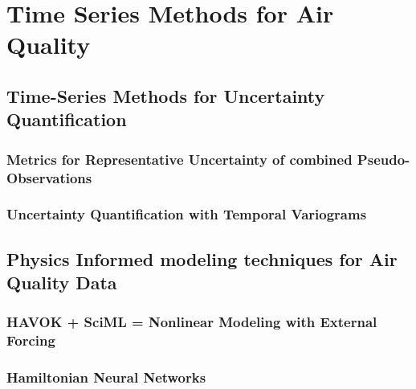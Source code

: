 \chapter{Time Series Methods for Air Quality}

\section{Time-Series Methods for Uncertainty Quantification}
\subsection{Metrics for Representative Uncertainty of combined Pseudo-Observations}
\subsection{Uncertainty Quantification with Temporal Variograms}

\section{Physics Informed modeling techniques for Air Quality Data}
\subsection{HAVOK + SciML = Nonlinear Modeling with External Forcing}
\subsection{Hamiltonian Neural Networks}
